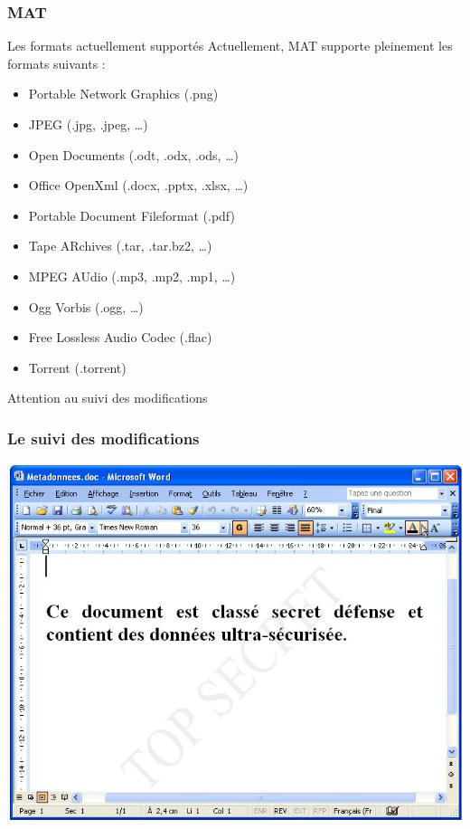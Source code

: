 \documentclass{beamer}
\begin{document}
\begin{frame}
\frametitle{MAT}

\begin{block}{Les formats actuellement supportés}
Actuellement, MAT supporte pleinement les formats suivants :
\begin{itemize}
\item Portable Network Graphics (.png)
\item JPEG (.jpg, .jpeg, …)
\item Open Documents (.odt, .odx, .ods, …)
\item Office OpenXml (.docx, .pptx, .xlsx, …)
\item Portable Document Fileformat (.pdf)
\item Tape ARchives (.tar, .tar.bz2, …)
\item MPEG AUdio (.mp3, .mp2, .mp1, …)
\item Ogg Vorbis (.ogg, …)
\item Free Lossless Audio Codec (.flac)
\item Torrent (.torrent)
\end{itemize}
\end{block}
\end{frame}


\begin{frame}
\Huge{\centerline{Attention au suivi des modifications}}
\end{frame}



\begin{frame}
\frametitle{Le suivi des modifications}
\begin{center}
\includegraphics[scale=0.6] {./images/SuiviModif01.jpg} 
\end{center}
\end{frame}
\end{document}
